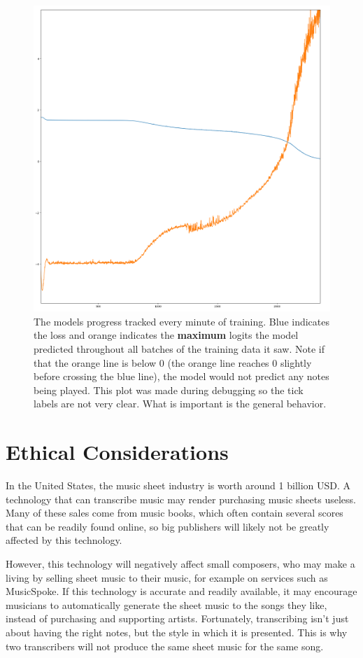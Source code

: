 \documentclass[a4paper,twocolumn,10pt]{article}
\begin{document}
\begin{figure}[h!]
  \centering
  \includegraphics[width=\linewidth]{figures/debug.png}
  \caption{The models progress tracked every minute of training. Blue indicates the loss and orange indicates the \textbf{maximum} logits the model predicted throughout all batches of the training data it saw. Note if that the orange line is below 0 (the orange line reaches 0 slightly before crossing the blue line), the model would not predict any notes being played. This plot was made during debugging so the tick labels are not very clear. What is important is the general behavior.}
  \label{fig:lr}
\end{figure}

\section{Ethical Considerations}
In the United States, the music sheet industry is worth around 1 billion USD\cite{musicspoke}. A technology that can transcribe music may render purchasing music sheets useless. Many of these sales come from music books, which often contain several scores that can be readily found online, so big publishers will likely not be greatly affected by this technology.

However, this technology will negatively affect small composers, who may make a living by selling sheet music to their music, for example on services such as MusicSpoke\cite{musicspoke}. If this technology is accurate and readily available, it may encourage musicians to automatically generate the sheet music to the songs they like, instead of purchasing and supporting artists. Fortunately, transcribing isn’t just about having the right notes, but the style in which it is presented. This is why two transcribers will not produce the same sheet music for the same song.
\end{document}
